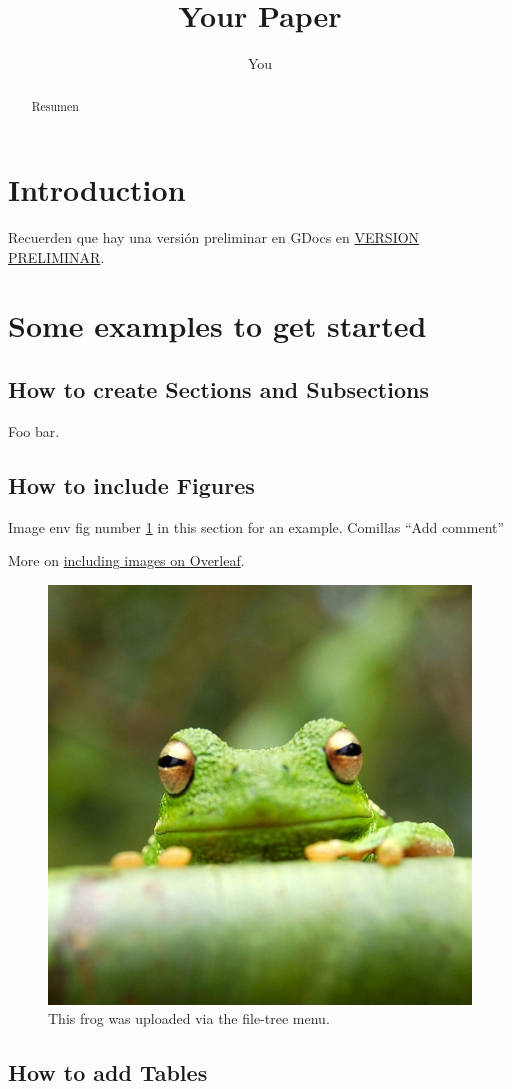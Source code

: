 \documentclass{article}
\title{Your Paper}
\author{You}
\begin{document}
\maketitle

\begin{abstract}
Resumen
\end{abstract}

\section{Introduction}

Recuerden que hay una versión preliminar en GDocs en \href{https://docs.google.com/document/d/1ghdXv3ZXT8j1sazVHm9kVIpXPqwd5GHxNdKcqtgIQcY/edit?tab=t.0}{VERSION PRELIMINAR}.

\section{Some examples to get started}

\subsection{How to create Sections and Subsections}

Foo bar.

\subsection{How to include Figures}

Image env fig number \ref{fig:frog} in this section for an example.
Comillas ``Add comment'' 

More on \href{https://www.overleaf.com/learn/how-to/Including_images_on_Overleaf}{including images on Overleaf}.

\begin{figure}
\centering
\includegraphics[width=0.25\linewidth]{frog.jpg}
\caption{\label{fig:frog}This frog was uploaded via the file-tree menu.}
\end{figure}

\subsection{How to add Tables}
\end{document}
